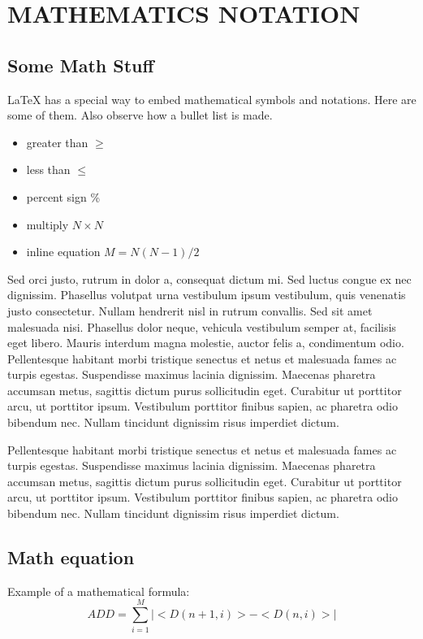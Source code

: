 

\chapter{MATHEMATICS NOTATION}
\section{Some Math Stuff}
LaTeX{} has a special way to embed mathematical symbols and notations. Here are some of them. Also observe how a bullet list is made.
\begin{itemize}\itemsep0pt \parskip0pt 
\item greater than $\ge$
\item less than $\le$
\item percent sign \%
\item multiply $N\times N$
\item inline equation $M = N(N-1)/2$
\end{itemize}
Sed orci justo, rutrum in dolor a, consequat dictum mi. Sed luctus congue ex nec dignissim. Phasellus volutpat urna vestibulum ipsum vestibulum, quis venenatis justo consectetur. Nullam hendrerit nisl in rutrum convallis. Sed sit amet malesuada nisi. Phasellus dolor neque, vehicula vestibulum semper at, facilisis eget libero. Mauris interdum magna molestie, auctor felis a, condimentum odio. Pellentesque habitant morbi tristique senectus et netus et malesuada fames ac turpis egestas. Suspendisse maximus lacinia dignissim. Maecenas pharetra accumsan metus, sagittis dictum purus sollicitudin eget. Curabitur ut porttitor arcu, ut porttitor ipsum. Vestibulum porttitor finibus sapien, ac pharetra odio bibendum nec. Nullam tincidunt dignissim risus imperdiet dictum.

Pellentesque habitant morbi tristique senectus et netus et malesuada fames ac turpis egestas. Suspendisse maximus lacinia dignissim. Maecenas pharetra accumsan metus, sagittis dictum purus sollicitudin eget. Curabitur ut porttitor arcu, ut porttitor ipsum. Vestibulum porttitor finibus sapien, ac pharetra odio bibendum nec. Nullam tincidunt dignissim risus imperdiet dictum.
\section{Math equation}
Example of a mathematical formula:
\begin{equation}
  ADD = \sum_{i=1}^{M}|<D(n+1,i)>-<D(n,i)>|
  \label{add}
\end{equation}

